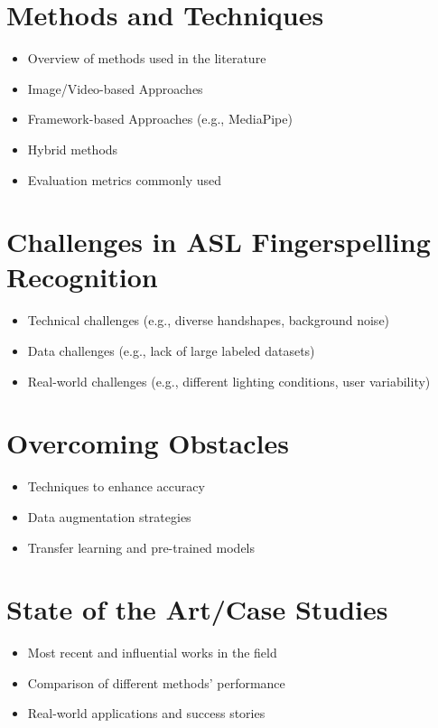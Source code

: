 \section{Methods and Techniques}
\begin{itemize}
    \item Overview of methods used in the literature
    \item Image/Video-based Approaches
    \item Framework-based Approaches (e.g., MediaPipe)
    \item Hybrid methods
    \item Evaluation metrics commonly used
\end{itemize}

\section{Challenges in ASL Fingerspelling Recognition}
\begin{itemize}
    \item Technical challenges (e.g., diverse handshapes, background noise)
    \item Data challenges (e.g., lack of large labeled datasets)
    \item Real-world challenges (e.g., different lighting conditions, user variability)
\end{itemize}

\section{Overcoming Obstacles}
\begin{itemize}
    \item Techniques to enhance accuracy
    \item Data augmentation strategies
    \item Transfer learning and pre-trained models
\end{itemize}

\section{State of the Art/Case Studies}
\begin{itemize}
    \item Most recent and influential works in the field
    \item Comparison of different methods' performance
    \item Real-world applications and success stories
\end{itemize}

